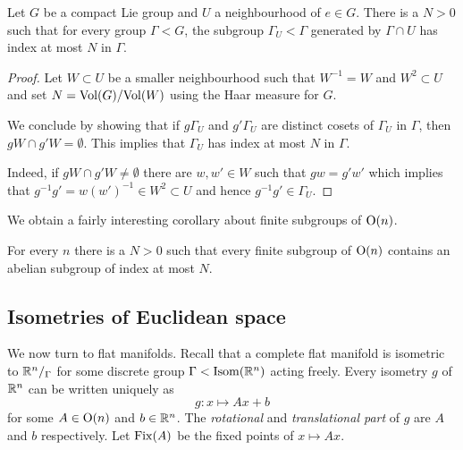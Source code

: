 \begin{prop} \label{U:finite:index:prop}
Let $G$ be a compact Lie group and $U$ a neighbourhood of $e\in G$. There is a $N>0$ such that for every group $\Gamma < G$, the subgroup $\Gamma_U< \Gamma$ generated by $\Gamma \cap U$ has index at most $N$ in $\Gamma$.
\end{prop}
\begin{proof}
Let $W\subset U$ be a smaller neighbourhood such that $W^{-1}=W$ and $W^2\subset U$ and set $N = {\rm Vol} (G) / {\rm Vol} (W)$ using the Haar measure for $G$.

We conclude by showing that if $g\Gamma_U$ and $g'\Gamma_U$ are distinct cosets of $\Gamma_U$ in $\Gamma$, then $gW \cap g'W = \emptyset$. This implies that $\Gamma_U$ has index at most $N$ in $\Gamma$.

Indeed, if $gW \cap g'W \neq \emptyset$ there are $w,w'\in W$ such that $gw = g'w'$ which implies that $g^{-1}g' = w(w')^{-1}\in W^2\subset U$ and hence $g^{-1}g' \in \Gamma_U$.
\end{proof}

We obtain a fairly interesting corollary about finite subgroups of ${\rm O}(n)$.

\begin{cor} \label{n:N:cor}
For every $n$ there is a $N>0$ such that every finite subgroup of ${\rm O}(n)$ contains an abelian subgroup of index at most $N$.
\end{cor}

\subsection{Isometries of Euclidean space}
We now turn to flat manifolds. Recall that a complete flat manifold is isometric to $\mathbb{R}^n/_\Gamma$ for some discrete group $\Gamma < {\rm Isom}(\mathbb{R}^n)$ acting freely. Every isometry $g$ of $\mathbb{R}^n$ can be written uniquely as
$$g\colon x \longmapsto Ax +b$$
for some $A\in {\rm O}(n)$ and $b\in \mathbb{R}^n$. The \emph{rotational} and \emph{translational part} of $g$ are $A$ and $b$ respectively. Let ${\rm Fix}(A)$ be the fixed points of $x\mapsto Ax$.

